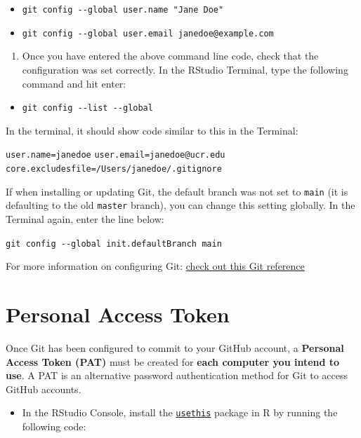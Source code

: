 \documentclass[
]{book}
\providecommand{\tightlist}{%
  \setlength{\itemsep}{0pt}\setlength{\parskip}{0pt}}
\begin{document}
\begin{itemize}
\tightlist
\item
  \texttt{git\ config\ -\/-global\ user.name\ "Jane\ Doe"}
\item
  \texttt{git\ config\ -\/-global\ user.email\ janedoe@example.com}
\end{itemize}

\begin{enumerate}
\def\labelenumi{\arabic{enumi}.}
\setcounter{enumi}{2}
\tightlist
\item
  Once you have entered the above command line code, check that the configuration was set correctly. In the RStudio Terminal, type the following command and hit enter:
\end{enumerate}

\begin{itemize}
\tightlist
\item
  \texttt{git\ config\ -\/-list\ -\/-global}
\end{itemize}

In the terminal, it should show code similar to this in the Terminal:

\texttt{user.name=janedoe}
\texttt{user.email=janedoe@ucr.edu}
\texttt{core.excludesfile=/Users/janedoe/.gitignore}

If when installing or updating Git, the default branch was not set to \texttt{main} (it is defaulting to the old \texttt{master} branch), you can change this setting globally. In the Terminal again, enter the line below:

\texttt{git\ config\ -\/-global\ init.defaultBranch\ main}

For more information on configuring Git: \href{https://git-scm.com/book/en/v2/Getting-Started-First-Time-Git-Setup}{check out this Git reference}

\hypertarget{personal-access-token}{%
\section{Personal Access Token}\label{personal-access-token}}

Once Git has been configured to commit to your GitHub account, a \textbf{Personal Access Token (PAT)} must be created for \textbf{each computer you intend to use}. A PAT is an alternative password authentication method for Git to access GitHub accounts.

\begin{itemize}
\tightlist
\item
  In the RStudio Console, install the \href{https://usethis.r-lib.org/}{\texttt{usethis}} package in R by running the following code:
\end{itemize}
\end{document}
